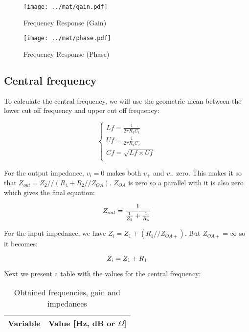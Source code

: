 \begin{figure}[H] \centering
\texttt{[image: ../mat/gain.pdf]}
\caption{Frequency Response (Gain)}
\label{fig:freq}
\end{figure}

\par

\begin{figure}[H] \centering
\texttt{[image: ../mat/phase.pdf]}
\caption{Frequency Response (Phase)}
\label{fig:freq}
\end{figure}


\subsection{Central frequency}
To calculate the central frequency, we will use the geometric mean between the lower cut off frequency and upper cut off frequency:

\begin{equation}\label{eq:whatever}
\begin{cases}
Lf=\frac{1}{2 \pi R_1 C_1}\\
Uf=\frac{1}{2 \pi R_4 C_2}\\
Cf=\sqrt{Lf \times Uf}\\
\end{cases}
\end{equation}

For the output impedance, $v_i=0$ makes both $v_+$ and $v_-$ zero. This makes it so that $Z_{out}=Z_2//(R_4 + R_2//Z_{OA})$. $Z_{OA}$ is zero so a parallel with it is also zero which gives the final equation:

\begin{equation}\label{eq:z_o}
Z_{out}=\frac{1}{\frac{1}{Z_2} + \frac{1}{R_4}}\\
\end{equation}

For the input impedance, we have $Z_i= Z_1+(R_1//Z_{OA+})$. But $Z_{OA+}=\infty$ so it becomes:

\begin{equation}\label{eq:z_o}
Z_i=Z_1 + R_1\\
\end{equation}

Next we present a table with the values for the central frequency:


\begin{table}[H]
  \centering
  \begin{tabular}{|l|r|}
    \hline    
    {\bf Variable} & {\bf Value [Hz, dB or $\Omega$]} \\ \hline
    
  \end{tabular}
  \caption{Obtained frequencies, gain and impedances}
  \label{tab:sim1}
\end{table}



